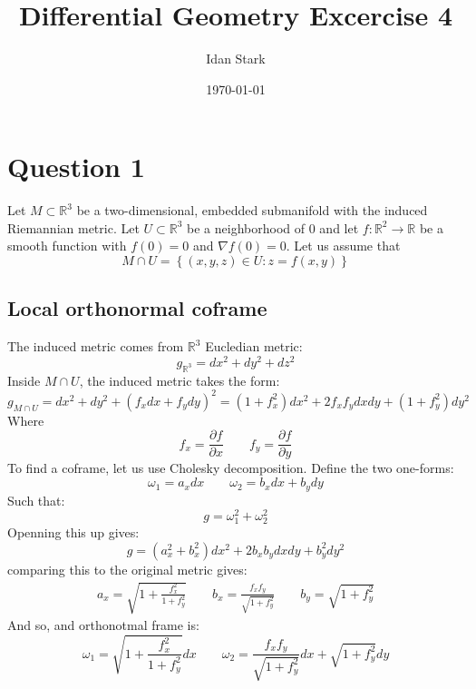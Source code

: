 \documentclass{article}
\title{Differential Geometry Excercise 4}
\author{Idan Stark}
\date{\today}
\newcommand{\R}{\ensuremath{\mathbb{R}}}
\begin{document}
\maketitle

\section*{Question 1}
Let $M \subset \R^3$ be a two-dimensional, embedded submanifold with the induced Riemannian metric.
Let $U \subset \R^3$ be a neighborhood of $0$ and let $f: \R^2 \rightarrow \R$ be a smooth function with $f(0) = 0$ and $\nabla f(0) = 0$. Let us assume that
\begin{equation}
    M \cap U = \left\{(x,y,z) \in U : z = f(x,y)\right\}
\end{equation}
\subsection*{Local orthonormal coframe}
The induced metric comes from $\R^3$ Eucledian metric:
\begin{equation}
    g_{\R^3} = dx^2 + dy^2 + dz^2
\end{equation}
Inside $M \cap U$, the induced metric takes the form:
\begin{equation}
    g_{M \cap U} = dx^2 + dy^2 + \left(f_x dx + f_y dy\right)^2 =
    \left(1 + f_x^2\right)dx^2 + 2f_xf_ydxdy + \left(1+ f_y^2\right)dy^2
\end{equation}
Where
\begin{equation}
    f_x = \frac{\partial f}{\partial x}
    \qquad
    f_y = \frac{\partial f}{\partial y}
\end{equation}
To find a coframe, let us use Cholesky decomposition. Define the two one-forms:
\begin{equation}
    \omega_1 = a_x dx
    \qquad
    \omega_2 = b_x dx + b_y dy
\end{equation}
Such that:
\begin{equation}
    g = \omega_1^2 + \omega_2^2
\end{equation}
Openning this up gives:
\begin{equation}
    g = (a_x^2 + b_x^2) dx^2 + 2b_xb_ydxdy + b_y^2dy^2
\end{equation}
comparing this to the original metric gives:
\begin{equation}
\begin{gathered}
    a_x = \sqrt{1 + \frac{f_x^2}{1 + f_y^2}}
    \qquad
    b_x = \frac{f_xf_y}{\sqrt{1 + f_y^2}}
    \qquad
    b_y = \sqrt{1 + f_y^2}
\end{gathered}
\end{equation}
And so, and orthonotmal frame is:
\begin{equation}
    \omega_1 = \sqrt{1 + \frac{f_x^2}{1 + f_y^2}}dx
    \qquad
    \omega_2 = \frac{f_xf_y}{\sqrt{1 + f_y^2}}dx + \sqrt{1 + f_y^2}dy
\end{equation}
\end{document}
